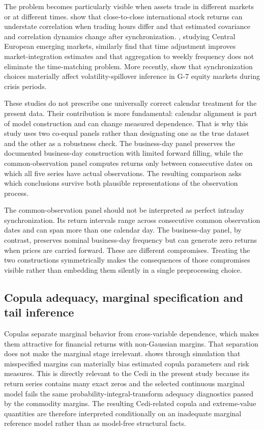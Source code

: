 The problem becomes particularly visible when assets trade in different markets or at different times. \citet{martens2001} show that close-to-close international stock returns can understate correlation when trading hours differ and that estimated covariance and correlation dynamics change after synchronization. \citet{schotman2006}, studying Central European emerging markets, similarly find that time adjustment improves market-integration estimates and that aggregation to weekly frequency does not eliminate the time-matching problem. More recently, \citet{dimitriou2025} show that synchronization choices materially affect volatility-spillover inference in G-7 equity markets during crisis periods.

These studies do not prescribe one universally correct calendar treatment for the present data. Their contribution is more fundamental: calendar alignment is part of model construction and can change measured dependence. That is why this study uses two co-equal panels rather than designating one as the true dataset and the other as a robustness check. The business-day panel preserves the documented business-day construction with limited forward filling, while the common-observation panel computes returns only between consecutive dates on which all five series have actual observations. The resulting comparison asks which conclusions survive both plausible representations of the observation process.

The common-observation panel should not be interpreted as perfect intraday synchronization. Its return intervals range across consecutive common observation dates and can span more than one calendar day. The business-day panel, by contrast, preserves nominal business-day frequency but can generate zero returns when prices are carried forward. These are different compromises. Treating the two constructions symmetrically makes the consequences of those compromises visible rather than embedding them silently in a single preprocessing choice.

\subsection{Copula adequacy, marginal specification and tail inference}

Copulas separate marginal behavior from cross-variable dependence, which makes them attractive for financial returns with non-Gaussian margins. That separation does not make the marginal stage irrelevant. \citet{fantazzini2009} shows through simulation that misspecified margins can materially bias estimated copula parameters and risk measures. This is directly relevant to the Cedi in the present study because its return series contains many exact zeros and the selected continuous marginal model fails the same probability-integral-transform adequacy diagnostics passed by the commodity margins. The resulting Cedi-related copula and extreme-value quantities are therefore interpreted conditionally on an inadequate marginal reference model rather than as model-free structural facts.

